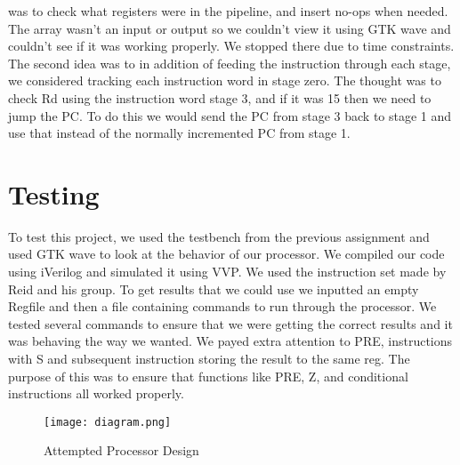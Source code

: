 \documentclass{article}
\begin{document}
\begin{multicols}{2}
was to check what registers were in the pipeline, and insert no-ops when needed. The array wasn't an input or output so we
couldn't view it using GTK wave and couldn't see if it was working properly. We stopped there due to time constraints. The
second idea was to in addition of feeding the instruction through each stage, we considered tracking each instruction word in
stage zero. The thought was to check Rd using the instruction word stage 3, and if it was 15 then we need to jump the PC. To
do this we would send the PC from stage 3 back to stage 1 and use that instead of the normally incremented PC
from stage 1. 

  
  \section{Testing}
To test this project, we used the testbench from the previous assignment and used GTK wave to look at the behavior of our
processor. We compiled our code using iVerilog and simulated it using VVP. We used the instruction set made by Reid and his group. To get results that we could use we inputted an empty
Regfile and then a file containing commands to run through the processor. We tested several commands to ensure that we
were getting the correct results and it was behaving the way we wanted. We payed extra attention to PRE, instructions with S
and subsequent instruction storing the result to the same reg. The purpose of this was to ensure that functions like PRE, Z, and
conditional instructions all worked properly. 
  
\end{multicols}

\begin{figure}[h]
\label{fig:1}
\caption{Attempted Processor Design}
\centering
\texttt{[image: diagram.png]}
\end{figure}
\end{document}
